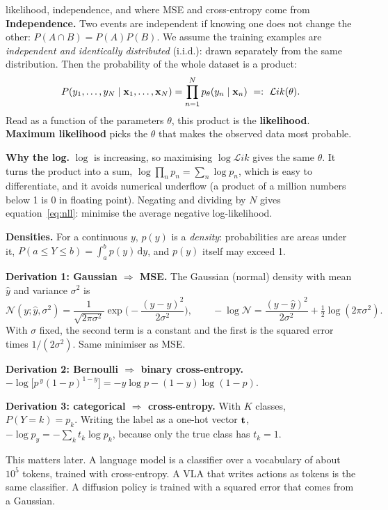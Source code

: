\begin{probbox}{likelihood, independence, and where MSE and cross-entropy come from}
\textbf{Independence.} Two events are independent if knowing one does not change the other: $P(A\cap B)=P(A)P(B)$. We assume the training examples are \emph{independent and identically distributed} (i.i.d.): drawn separately from the same distribution. Then the probability of the whole dataset is a product:
\[
P(y_1,\dots,y_N\mid\mathbf{x}_1,\dots,\mathbf{x}_N)=\prod_{n=1}^N p_\theta(y_n\mid\mathbf{x}_n)\ =:\ \mathcal{L}ik(\theta).
\]
Read as a function of the parameters $\theta$, this product is the \textbf{likelihood}. \textbf{Maximum likelihood} picks the $\theta$ that makes the observed data most probable.

\textbf{Why the log.} $\log$ is increasing, so maximising $\log\mathcal Lik$ gives the same $\theta$. It turns the product into a sum, $\log\prod_n p_n=\sum_n\log p_n$, which is easy to differentiate, and it avoids numerical underflow (a product of a million numbers below 1 is 0 in floating point). Negating and dividing by $N$ gives equation~\eqref{eq:nll}: minimise the average negative log-likelihood.

\textbf{Densities.} For a continuous $y$, $p(y)$ is a \emph{density}: probabilities are areas under it, $P(a\le Y\le b)=\int_a^b p(y)\,\mathrm dy$, and $p(y)$ itself may exceed 1.

\textbf{Derivation 1: Gaussian $\Rightarrow$ MSE.} The Gaussian (normal) density with mean $\hat y$ and variance $\sigma^2$ is
\[
\mathcal N(y;\hat y,\sigma^2)=\frac{1}{\sqrt{2\pi\sigma^2}}\exp\!\Big(-\frac{(y-\hat y)^2}{2\sigma^2}\Big),
\qquad
-\log\mathcal N=\frac{(y-\hat y)^2}{2\sigma^2}+\tfrac12\log(2\pi\sigma^2).
\]
With $\sigma$ fixed, the second term is a constant and the first is the squared error times $1/(2\sigma^2)$. Same minimiser as MSE.

\textbf{Derivation 2: Bernoulli $\Rightarrow$ binary cross-entropy.} $-\log\big[p^{\,y}(1-p)^{1-y}\big]=-y\log p-(1-y)\log(1-p)$.

\textbf{Derivation 3: categorical $\Rightarrow$ cross-entropy.} With $K$ classes, $P(Y=k)=p_k$. Writing the label as a one-hot vector $\mathbf{t}$, $-\log p_y=-\sum_k t_k\log p_k$, because only the true class has $t_k=1$.
\end{probbox}
This matters later. A language model is a classifier over a vocabulary of about $10^5$ tokens, trained with cross-entropy. A VLA that writes actions as tokens is the same classifier. A diffusion policy is trained with a squared error that comes from a Gaussian.

